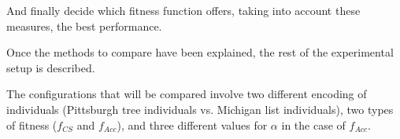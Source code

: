 \documentclass[runningheads]{llncs}
\begin{document}
And finally decide which fitness function offers, taking into account these measures, the best performance. 



\label{sec:experiments}

Once the methods to compare have been explained, the rest of the experimental setup is described.

The configurations that will be compared involve two different encoding of individuals (Pittsburgh tree individuals vs. Michigan list individuals), two types of fitness ($f_{CS}$ and $f_{Acc}$), and three different values for $\alpha$ in the case of $f_{Acc}$.
\end{document}
